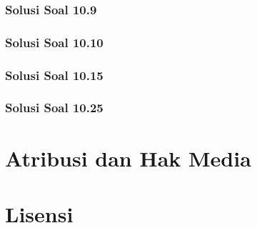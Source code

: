 \documentclass[11pt,a4paper,oneside]{book}
\begin{document}
\subsection*{Solusi Soal 10.9}

\subsection*{Solusi Soal 10.10}

\subsection*{Solusi Soal 10.15}

\subsection*{Solusi Soal 10.25}


\backmatter
\listoffigures
\chapter*{Atribusi dan Hak Media}










\chapter*{Lisensi}
\Lizenztext
\end{document}
